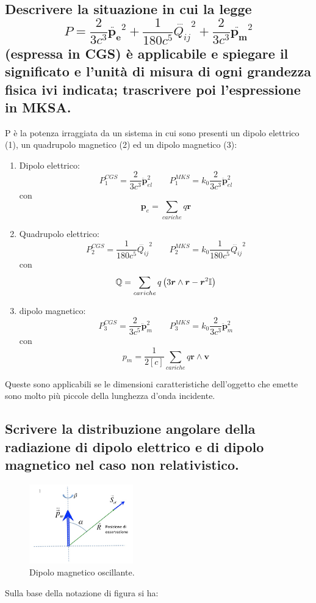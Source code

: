 \subsection[]{ Descrivere la situazione in cui la legge 
\[
	P = \frac{2}{3c^3} \ddot{\boldsymbol{p_{e}}}^2 + \frac{1}{180 c^5} \dddot{Q_{ij}}^2 + \frac{2}{3c^3} \ddot{\boldsymbol{p_m}}^2
\] 
(espressa in CGS) è applicabile e spiegare il significato e l'unità di misura di ogni grandezza fisica ivi indicata; trascrivere poi l'espressione in MKSA.}
P è la potenza irraggiata da un sistema in cui sono presenti un dipolo elettrico (1), un quadrupolo magnetico (2) ed un dipolo magnetico (3):
\begin{enumerate}
	\item Dipolo elettrico:
	\[
		P_{1}^{CGS} = \frac{2}{3 c^3} \ddot{\boldsymbol{p}}_{el}^2 \quad \quad 
		P_{1}^{MKS} = k_{0}\frac{2}{3 c^3} \ddot{\boldsymbol{p}}_{el}^2
	\]
	con
	\[
		\boldsymbol{p}_{e} = \sum_{cariche} q \boldsymbol{r} 
	\] 
	\item Quadrupolo elettrico:
	\[
		P_{2}^{CGS} = \frac{1}{180 c^{5}}\dddot{Q_{ij}}^2 \quad \quad 
		P_{2}^{MKS} = k_{0} \frac{1}{180 c^{5}} \dddot{Q_{ij}}^2
	\]
	con
	\[
		\mathbb{Q} = \sum_{cariche}q\left( 3 \boldsymbol{r} \wedge \boldsymbol{r} - \boldsymbol{r}^2\mathbb{I} \right) 
	\] 
	\item dipolo magnetico:
	\[
		P_{3}^{CGS} = \frac{2}{3c^{5}} \ddot{\boldsymbol{p}}_{m}^2 \quad \quad 
		P_{3}^{MKS} = k_{0} \frac{2}{3c^3} \ddot{\boldsymbol{p} }_{m}^2
	\]
	con
	\[
		p_{m} = \frac{1}{2[c]} \sum_{cariche} q \boldsymbol{r} \wedge \boldsymbol{v}   
	\] 
\end{enumerate}
Queste sono applicabili se le dimensioni caratteristiche dell'oggetto che emette sono molto più piccole della lunghezza d'onda incidente. 


\subsection[]{ Scrivere la distribuzione angolare della radiazione di dipolo elettrico e di dipolo magnetico nel caso non relativistico.}
\begin{figure}[H]
	\centering
	\includegraphics[width=0.4\textwidth]{immagini/2.png}
	\caption{Dipolo magnetico oscillante.}
	\label{fig:2}
\end{figure}
Sulla base della notazione di figura si ha:
